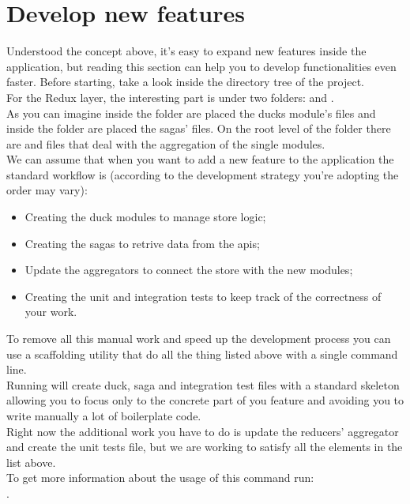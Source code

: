 \documentclass[../redux]{subfiles}
\begin{document}
	\section{Develop new features}
	Understood the concept above, it's easy to expand new features inside the application, but reading this section can help you to develop functionalities even faster.
	Before starting, take a look inside the directory tree of the project. \\
	For the Redux layer, the interesting part is under two folders:  and .\\
	As you can imagine inside the  folder are placed the ducks module's files and inside the  folder are placed the sagas' files. On the root level of the  folder there are  and  files that deal with the aggregation of the single modules. \\
	We can assume that when you want to add a new feature to the application the standard workflow is (according to the development strategy you're adopting the order may vary):
	\begin{itemize}
		\item Creating the duck modules to manage store logic;
		\item Creating the sagas to retrive data from the apis;
		\item Update the aggregators to connect the store with the new modules;
		\item Creating the unit and integration tests to keep track of the correctness of your work.
	\end{itemize}
	To remove all this manual work and speed up the development process you can use a scaffolding utility that do all the thing listed above with a single command line. \\
	Running  will create duck, saga and integration test files with a standard skeleton allowing you to focus only to the concrete part of you feature and avoiding you to write manually a lot of boilerplate code. \\
	Right now the additional work you have to do is update the reducers' aggregator and create the unit tests file, but we are working to satisfy all the elements in the list above. \\
	To get more information about the usage of this command run: \\ .
	
	
\end{document}
